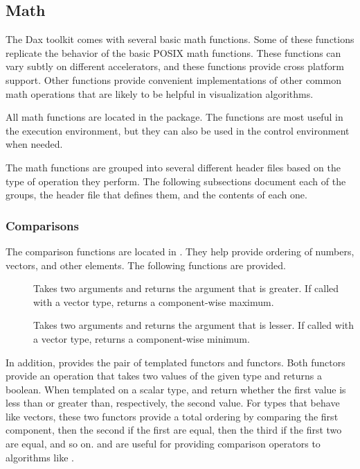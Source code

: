 
\subsection{Math}
\label{sec:Math}


The Dax toolkit comes with several basic math functions. Some of these
functions replicate the behavior of the basic POSIX math functions. These
functions can vary subtly on different accelerators, and these functions
provide cross platform support. Other functions provide convenient
implementations of other common math operations that are likely to be
helpful in visualization algorithms.

All math functions are located in the \daxmath{} package. The functions are
most useful in the execution environment, but they can also be used in the
control environment when needed.

The math functions are grouped into several different header files based on
the type of operation they perform. The following subsections document each
of the groups, the header file that defines them, and the contents of each
one.

\subsubsection{Comparisons}

The comparison functions are located in
. They help provide ordering of numbers,
vectors, and other elements. The following functions are provided.

\begin{description}
\item[]  Takes two arguments and returns the
  argument that is greater. If called with a vector type, returns a
  component-wise maximum.
\item[]  Takes two arguments and returns the
  argument that is lesser. If called with a vector type, returns a
  component-wise minimum.
\end{description}

In addition,  provides the pair of templated
functors  and  functors. Both
functors provide an operation that takes two values of the given type and
returns a boolean. When templated on a scalar type,
 and  return whether
the first value is less than or greater than, respectively, the second
value. For types that behave like vectors, these two functors provide a
total ordering by comparing the first component, then the second if the
first are equal, then the third if the first two are equal, and so
on.  and  are useful
for providing comparison operators to algorithms like .

